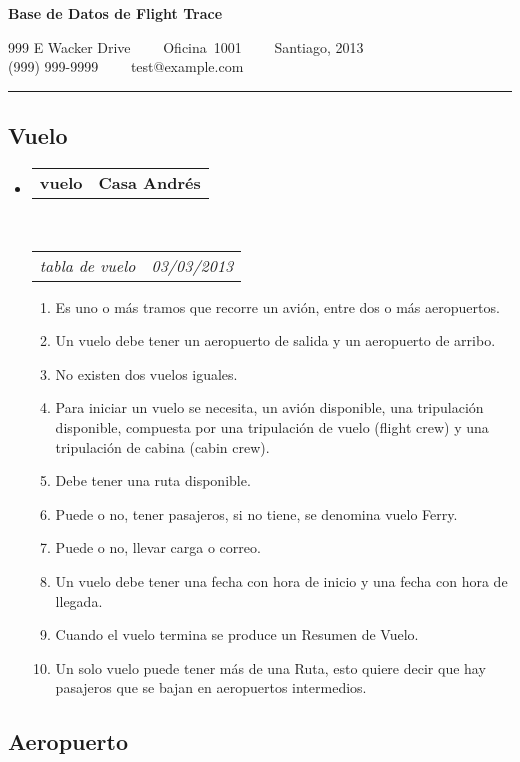 \documentclass[10pt,letterpaper]{article}
\makeatletter
\newcommand{\headerrow}[2]
{\begin{tabular*}{\linewidth}{l@{\extracolsep{\fill}}r}
	#1 &
	#2 \\
\end{tabular*}}
\makeatother
\begin{document}
\begin{center}
{\LARGE \textbf{Base de Datos de Flight Trace}}

999 E Wacker Drive\ \ \textbullet
\ \ Oficina\ 1001\ \ \textbullet
\ \ Santiago, 2013
\\
(999) 999-9999\ \ \textbullet
\ \ test@example.com
\end{center}

\hrule
\vspace{-0.4em}

\subsection*{Vuelo}

\begin{itemize}
	\parskip=0.1em

	\item
	\headerrow
		{\textbf{vuelo}}
		{\textbf{Casa Andrés}}
	\\
	\headerrow
		{\emph{tabla de vuelo}}
		{\emph{03/03/2013}}
	\begin{enumerate}
		\item Es uno o más tramos que recorre un avión, entre dos o más aeropuertos.
		\item Un vuelo debe tener un aeropuerto de salida y un aeropuerto de arribo.
		\item No existen dos vuelos iguales.
		\item Para iniciar un vuelo se necesita, un avión disponible, una tripulación disponible, compuesta por una tripulación de vuelo (flight crew) y una tripulación de cabina (cabin crew).
		\item Debe tener una ruta disponible.
		\item Puede o no, tener pasajeros, si no tiene, se denomina vuelo Ferry.
		\item Puede o no, llevar carga o correo.
		\item Un vuelo debe tener una fecha con hora de inicio y una fecha con hora de llegada.
		\item Cuando el vuelo termina se produce un Resumen de Vuelo.
		\item Un solo vuelo puede tener más de una Ruta, esto quiere decir que hay pasajeros que se bajan en aeropuertos intermedios.
	\end{enumerate}

\end{itemize}

\subsection*{Aeropuerto}
\end{document}
